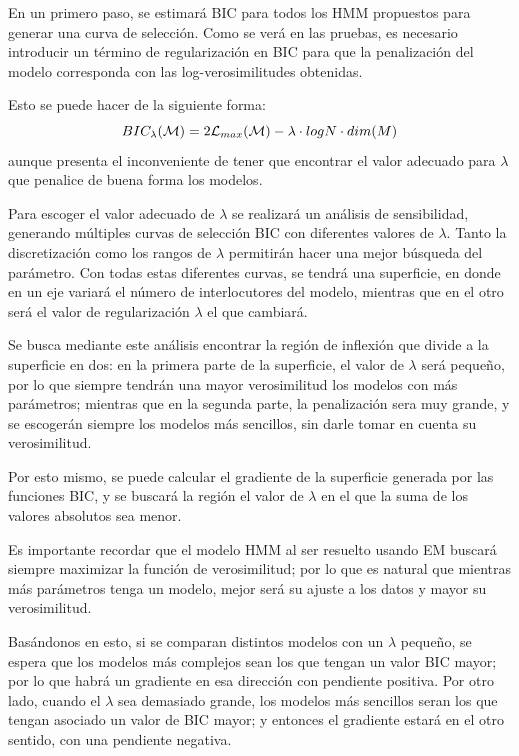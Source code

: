 En un primero paso, se estimará \ac{BIC} para todos los \ac{HMM} propuestos para generar una curva de selección. Como se verá en las pruebas, es necesario introducir un término de regularización en \ac{BIC} para que la penalización del modelo corresponda con las log-verosimilitudes obtenidas. 

Esto se puede hacer de la siguiente forma: 
\begin{equation}
BIC_{\lambda}(\mathcal{M}) = 2 \mathcal{L}_{max}(\mathcal{M}) - \lambda \cdot log N \cdot dim(M)
\end{equation}
aunque presenta el inconveniente de tener que encontrar el valor adecuado para $\lambda$ que penalice de buena forma los modelos. 

Para escoger el valor adecuado de $\lambda$ se realizará un análisis de sensibilidad, generando múltiples curvas de selección \ac{BIC} con diferentes valores de $\lambda$. Tanto la discretización como los rangos de $\lambda$ permitirán hacer una mejor búsqueda del parámetro. Con todas estas diferentes curvas, se tendrá una superficie, en donde en un eje variará el número de interlocutores del modelo, mientras que en el otro será el valor de regularización $\lambda$ el que cambiará. 

Se busca mediante este análisis encontrar la región de inflexión que divide a la superficie en dos: en la primera parte de la superficie, el valor de $\lambda$ será pequeño, por lo que siempre tendrán una mayor verosimilitud los modelos con más parámetros; mientras que en la segunda parte, la penalización sera muy grande, y se escogerán siempre los modelos más sencillos, sin darle tomar en cuenta su verosimilitud.

Por esto mismo, se puede calcular el gradiente de la superficie generada por las funciones \ac{BIC}, y se buscará la región el valor de $\lambda$ en el que la suma de los valores absolutos sea menor. 

Es importante recordar que el modelo \ac{HMM} al ser resuelto usando \ac{EM} buscará siempre maximizar la función de verosimilitud; por lo que es natural que mientras más parámetros tenga un modelo, mejor será su ajuste a los datos y mayor su verosimilitud.

Basándonos en esto, si se comparan distintos modelos con un $\lambda$ pequeño, se espera que los modelos más complejos sean los que tengan un valor \ac{BIC} mayor; por lo que habrá un gradiente en esa dirección con pendiente positiva. Por otro lado, cuando el $\lambda$ sea demasiado grande, los modelos más sencillos seran los que tengan asociado un valor de \ac{BIC} mayor; y entonces el gradiente estará en el otro sentido, con una pendiente negativa. 

